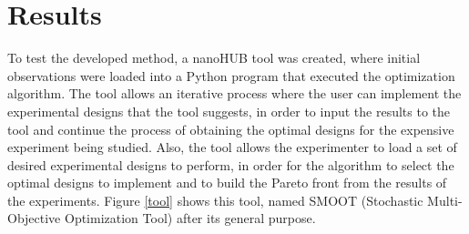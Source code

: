 \documentclass{article}
\begin{document}
\section{Results}

To test the developed method, a nanoHUB tool was created, where initial observations were loaded into a Python program that executed the optimization algorithm. The tool allows an iterative process where the user can implement the experimental designs that the tool suggests, in order to input the results to the tool and continue the process of obtaining the optimal designs for the expensive experiment being studied. Also, the tool allows the experimenter to load a set of desired experimental designs to perform, in order for the algorithm to select the optimal designs to implement and to build the Pareto front from the results of the experiments. Figure \ref{tool} shows this tool, named SMOOT (Stochastic Multi-Objective Optimization Tool) after its general purpose.
\end{document}

